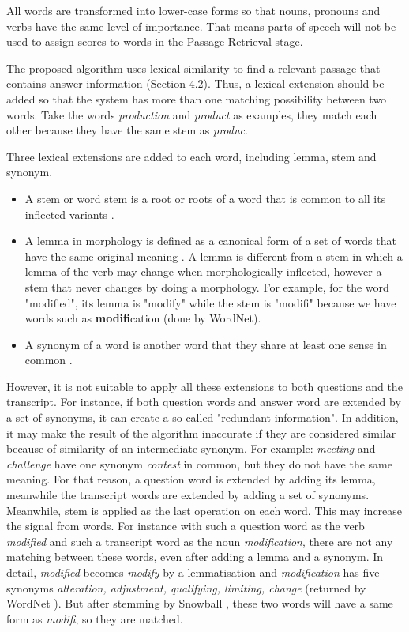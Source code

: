 All words are transformed into lower-case forms so that nouns, pronouns and verbs have the same level of importance. That means parts-of-speech will not be used to assign scores to words in the Passage Retrieval stage.

The proposed algorithm uses lexical similarity to find a relevant passage that contains answer information (Section 4.2). Thus, a lexical extension should be added so that the system has more than one matching possibility between two words. Take the words \textit{production} and \textit{product} as examples, they match each other because they have the same stem as \textit{produc}.

Three lexical extensions are added to each word, including lemma, stem and synonym. 
\begin{itemize}
\item {A stem or word stem is a root or roots of a word that is common to all its inflected variants \cite{Stem}.}
\item {A lemma in morphology is defined as a canonical form of a set of words that have the same original meaning \cite{clement2004mba}. A lemma is different from a stem in which a lemma of the verb may change when morphologically inflected, however a stem that never changes by doing a morphology. For example, for the word "modified", its lemma is "modify" while the stem is "modifi" because we have words such as \textbf{modifi}cation (done by WordNet\cite{miller1995wld}).}
\item {A synonym of a word is another word that they share at least one sense in common \cite{miller1995wld}.}
\end{itemize}

However, it is not suitable to apply all these extensions to both questions and the transcript. For instance, if both question words and answer word are extended by a set of synonyms, it can create a so called "redundant information". In addition, it may make the result of the algorithm inaccurate if they are considered similar because of similarity of an intermediate synonym. For example: \textit{meeting} and \textit{challenge} have one synonym \textit{contest} in common, but they do not have the same meaning. For that reason, a question word is extended by adding its lemma, meanwhile the transcript words are extended by adding a set of synonyms. Meanwhile, stem is applied as the last operation on each word. This may increase the signal from words. For instance with such a question word as the verb \textit{modified} and such a transcript word as the noun \textit{modification}, there are not any matching between these words, even after adding a lemma and a synonym.  In detail, \textit{modified} becomes \textit{modify} by a lemmatisation and \textit{modification} has five synonyms \textit{alteration, adjustment, qualifying, limiting, change} (returned by WordNet \cite{pasca2001irw}). But after stemming by Snowball \cite{porter2001ss}, these two words will have a same form as \textit{modifi}, so they are matched.

